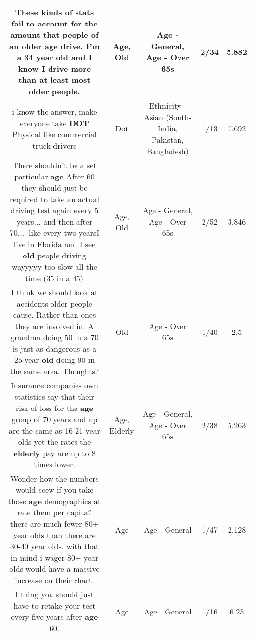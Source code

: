 \documentclass[11pt]{article}
\newlength\mylength
\begin{document}
\begin{center}
\begin{longtable}{|C{.65\mylength}|C{.30\mylength}|C{.12\mylength}|C{.12\mylength}|C{.12\mylength}|}
  \small These kinds of stats fail to account for the amount that people of an older \textbf{age} drive. I'm a 34 year \textbf{old} and I know I drive more than at least most older people.\normalsize   & Age, Old & Age - General, Age - Over 65s & 2/34 & 5.882 \\  \hline
  \small i know the answer, make everyone take \textbf{DOT} Physical like commercial truck drivers\normalsize   & Dot & Ethnicity - Asian (South- India, Pakistan, Bangladesh) & 1/13 & 7.692 \\  \hline
  \small There shouldn't be a set particular \textbf{age} After 60 they should just be required to take an actual driving test again every 5 years... and then after 70.... like every two yearsI live in Florida and I see \textbf{old} people driving wayyyyy too slow all the time (35 in a 45)\normalsize   & Age, Old & Age - General, Age - Over 65s & 2/52 & 3.846 \\  \hline
  \small I think we should look at accidents older people cause. Rather than ones they are involved in. A grandma doing 50 in a 70 is just as dangerous as a 25 year \textbf{old} doing 90 in the same area. Thoughts?\normalsize   & Old & Age - Over 65s & 1/40 & 2.5 \\  \hline
  \small Insurance companies own statistics say that their risk of loss for the \textbf{age} group of 70 years and up are the same as 16-21 year olds yet the rates the \textbf{elderly} pay are up to 8 times lower.\normalsize   & Age, Elderly & Age - General, Age - Over 65s & 2/38 & 5.263 \\  \hline
  \small Wonder how the numbers would scew if you take those \textbf{age} demographics at rate them per capita? there are much fewer 80+ year olds than there are 30-40 year olds. with that in mind i wager 80+ year olds would have a massive increase on their chart.\normalsize   & Age & Age - General & 1/47 & 2.128 \\  \hline
  \small I thing you should just have to retake your test every five years after \textbf{age} 60.\normalsize   & Age & Age - General & 1/16 & 6.25 \\  \hline

\end{longtable}
\end{center}
\end{document}
